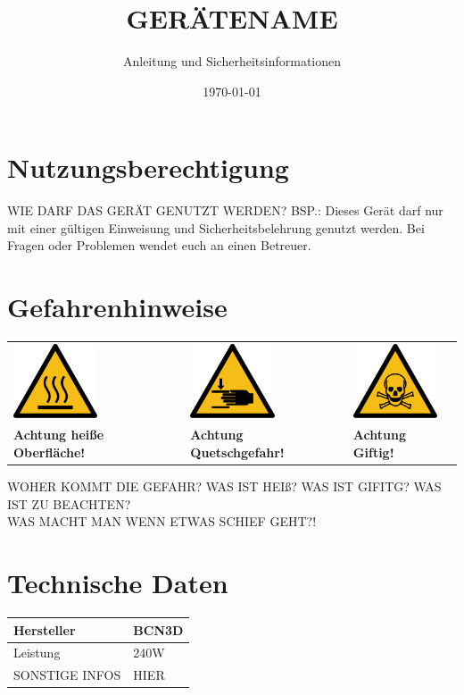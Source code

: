 \documentclass[a4paper]{article}
\begin{document}
\author{Anleitung und Sicherheitsinformationen} %
\title{GERÄTENAME}
\date{\today{}} %
\maketitle{} %
\section{Nutzungsberechtigung}
WIE DARF DAS GERÄT GENUTZT WERDEN? BSP.:
Dieses Gerät darf nur mit einer gültigen Einweisung und Sicherheitsbelehrung genutzt werden. Bei Fragen oder Problemen wendet euch an einen Betreuer.
\section{Gefahrenhinweise}
\begin{center}
	\begin{tabular}{C{5cm}C{5cm}C{5cm}}
		\includegraphics[width=2.5cm]{hot-surface.png} & \includegraphics[width=2.5cm]{hand-injury.png} & \includegraphics[width=2.5cm]{toxic.png}\\
		\textbf{Achtung heiße Oberfläche!} & \textbf{Achtung Quetschgefahr!} & \textbf{Achtung Giftig!}
	\end{tabular}
\end{center}
WOHER KOMMT DIE GEFAHR? WAS IST HEIß? WAS IST GIFITG? WAS IST ZU BEACHTEN? \\
WAS MACHT MAN WENN ETWAS SCHIEF GEHT?!

\section{Technische Daten}
 \begin{tabular}{|l|l|}
 	\hline
 	Hersteller & BCN3D\\
 	\hline
	Leistung & 240W \\
	SONSTIGE INFOS & HIER\\
	\hline
\end{tabular}
\newpage
\end{document}
